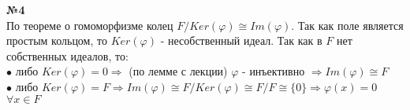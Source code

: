 \documentclass[a4paper, 12pt]{article}
\begin{document}
	\textbf{№4} \\
	
	По теореме о гомоморфизме колец $F/Ker(\varphi) \cong Im(\varphi)$. Так как поле является простым кольцом, то $Ker(\varphi)$ - несобственный идеал. Так как в $F$ нет собственных идеалов, то: \\
	$\bullet$ либо $Ker(\varphi) = 0 \Rightarrow$ (по лемме с лекции) $\varphi$ - инъективно $\Rightarrow Im(\varphi) \cong F$ \\
	$\bullet$ либо $Ker(\varphi) = F \Rightarrow Im(\varphi) \cong F/Ker(\varphi) \cong F/F \cong \{0\} \Rightarrow \varphi(x) = 0$ $\forall x \in F$ \\
	
\end{document}
